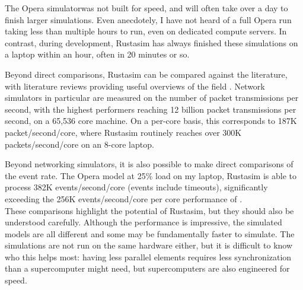 The Opera simulator\opera was not built for speed, and will often take over a day to finish larger simulations. %
Even anecdotely, I have not heard of a full Opera run taking less than multiple hours to run, even on dedicated compute servers.
In contrast, during development, Rustasim has always finished these simulations on a laptop within an hour, often in 20 minutes or so.

Beyond direct comparisons, Rustasim can be compared against the literature, with literature reviews providing useful overviews of the field \cite{fujimoto_computational_2017}.
Network simulators in particular are measured on the number of packet transmissions per second, with the highest performers reaching 12 billion packet transmissions per second, on a 65,536 core machine.
On a per-core basis, this corresponds to 187K packet/second/core, where Rustasim routinely reaches over 300K packets/second/core on an 8-core laptop. %

Beyond networking simulators, it is also possible to make direct comparisons of the event rate.
The Opera model at 25\% load on my laptop, Rustasim is able to process 382K events/second/core (events include timeouts), significantly exceeding the 256K events/second/core per core performance of .%
\\

These comparisons highlight the potential of Rustasim, but they should also be understood carefully.
Although the performance is impressive, the simulated models are all different and some may be fundamentally faster to simulate.
The simulations are not run on the same hardware either, but it is difficult to know who this helps most: having less parallel elements requires less synchronization than a supercomputer might need, but supercomputers are also engineered for speed.
